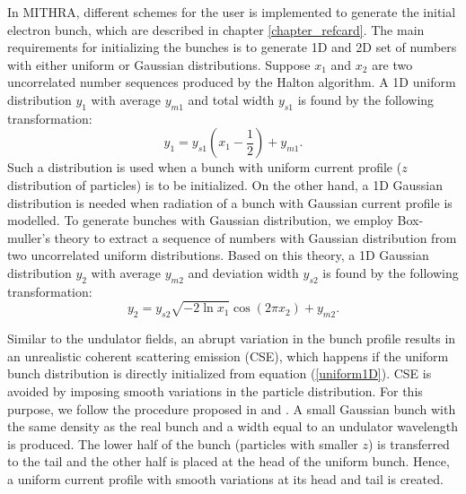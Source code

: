 In MITHRA, different schemes for the user is implemented to generate the initial electron bunch, which are described in chapter \ref{chapter_refcard}.
%
The main requirements for initializing the bunches is to generate 1D and 2D set of numbers with either uniform or Gaussian distributions.
%
Suppose $x_1$ and $x_2$ are two uncorrelated number sequences produced by the Halton algorithm.
%
A 1D uniform distribution $y_1$ with average $y_{m1}$ and total width $y_{s1}$ is found by the following transformation:
%
\begin{equation}
\label{uniform1D}
y_1 = y_{s1} (x_1 - \frac{1}{2}) + y_{m1}.
\end{equation}
%
Such a distribution is used when a bunch with uniform current profile ($z$ distribution of particles) is to be initialized.
%
On the other hand, a 1D Gaussian distribution is needed when radiation of a bunch with Gaussian current profile is modelled.
%
To generate bunches with Gaussian distribution, we employ Box-muller's theory to extract a sequence of numbers with Gaussian distribution from two uncorrelated uniform distributions.
%
Based on this theory, a 1D Gaussian distribution $y_2$ with average $y_{m2}$ and deviation width $y_{s2}$ is found by the following transformation:
%
\begin{equation}
\label{gaussian1D}
y_2 = y_{s2} \sqrt{-2 \ln x_1} \cos(2\pi x_2) + y_{m2}.
\end{equation}

Similar to the undulator fields, an abrupt variation in the bunch profile results in an unrealistic coherent scattering emission (CSE), which happens if the uniform bunch distribution is directly initialized from equation (\ref{uniform1D}).
%
CSE is avoided by imposing smooth variations in the particle distribution.
%
For this purpose, we follow the procedure proposed in \cite{penman199282} and \cite{reiche2000numerical}.
%
A small Gaussian bunch with the same density as the real bunch and a width equal to an undulator wavelength is produced.
%
The lower half of the bunch (particles with smaller $z$) is transferred to the tail and the other half is placed at the head of the uniform bunch.
%
Hence, a uniform current profile with smooth variations at its head and tail is created.

